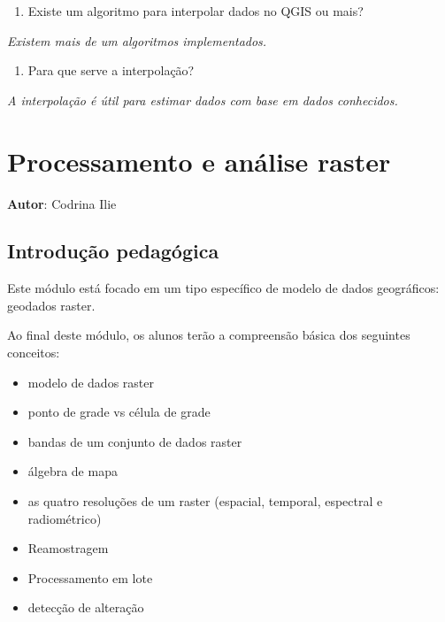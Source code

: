 \documentclass[
  portuguese,
]{krantz}
\providecommand{\tightlist}{%
  \setlength{\itemsep}{0pt}\setlength{\parskip}{0pt}}
\begin{document}
\begin{enumerate}
\def\labelenumi{\arabic{enumi}.}
\tightlist
\item
  Existe um algoritmo para interpolar dados no QGIS ou mais?
\end{enumerate}

\emph{Existem mais de um algoritmos implementados.}

\begin{enumerate}
\def\labelenumi{\arabic{enumi}.}
\setcounter{enumi}{1}
\tightlist
\item
  Para que serve a interpolação?
\end{enumerate}

\emph{A interpolação é útil para estimar dados com base em dados conhecidos.}

\hypertarget{processamento-e-anuxe1lise-raster}{%
\chapter{\texorpdfstring{\textbf{Processamento e análise raster}}{Processamento e análise raster}}\label{processamento-e-anuxe1lise-raster}}

\textbf{Autor}: Codrina Ilie

\hypertarget{introduuxe7uxe3o-pedaguxf3gica-9}{%
\section{Introdução pedagógica}\label{introduuxe7uxe3o-pedaguxf3gica-9}}

Este módulo está focado em um tipo específico de modelo de dados geográficos: geodados raster.

Ao final deste módulo, os alunos terão a compreensão básica dos seguintes conceitos:

\begin{itemize}
\tightlist
\item
  modelo de dados raster
\item
  ponto de grade vs célula de grade
\item
  bandas de um conjunto de dados raster
\item
  álgebra de mapa
\item
  as quatro resoluções de um raster (espacial, temporal, espectral e radiométrico)
\item
  Reamostragem
\item
  Processamento em lote
\item
  detecção de alteração
\end{itemize}
\end{document}

